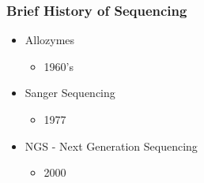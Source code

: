 \documentclass[14pt]{beamer}
\begin{document}
\begin{frame}
\frametitle{Brief History of Sequencing}
\begin{itemize}
	\item Allozymes
	\begin{itemize}
		\item 1960's
	\end{itemize}
	\item Sanger Sequencing
	\begin{itemize}
		\item 1977
	\end{itemize}
	\item NGS - Next Generation Sequencing
	\begin{itemize}
		\item 2000
	\end{itemize}
\end{itemize}
\end{frame}
\end{document}

